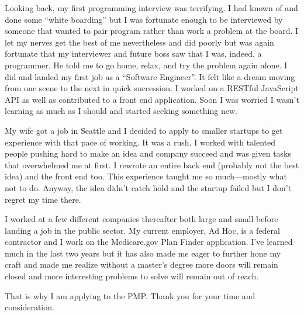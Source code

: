 \documentclass[12pt]{article}
\begin{document}
Looking back, my first programming interview was terrifying. I had known of and done some ``white boarding'' but I was fortunate enough to be interviewed by someone that wanted to pair program rather than work a problem at the board. I let my nerves get the best of me nevertheless and did poorly but was again fortunate that my interviewer and future boss saw that I was, indeed, a programmer. He told me to go home, relax, and try the problem again alone. I did and landed my first job as a ``Software Engineer''. It felt like a dream moving from one scene to the next in quick succession. I worked on a RESTful JavaScript API as well as contributed to a front end application. Soon I was worried I wasn't learning as much as I should and started seeking something new.

My wife got a job in Seattle and I decided to apply to smaller startups to get experience with that pace of working. It was a rush. I worked with talented people pushing hard to make an idea and company succeed and was given tasks that overwhelmed me at first. I rewrote an entire back end (probably not the best idea) and the front end too. This experience taught me so much---mostly what not to do. Anyway, the idea didn't catch hold and the startup failed but I don't regret my time there.

I worked at a few different companies thereafter both large and small before landing a job in the public sector. My current employer, Ad Hoc, is a federal contractor and I work on the Medicare.gov Plan Finder application. I've learned much in the last two years but it has also made me eager to further hone my craft and made me realize without a master's degree more doors will remain closed and more interesting problems to solve will remain out of reach.

That is why I am applying to the PMP. Thank you for your time and consideration.
\end{document}
